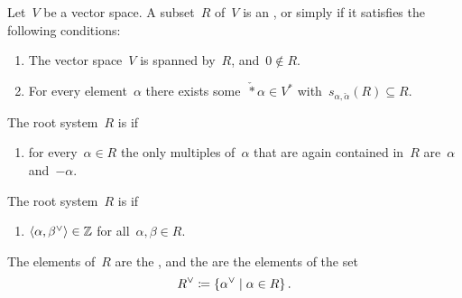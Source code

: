\begin{definition}
  Let~$V$ be a vector space.
  A subset~$R$ of~$V$ is an , or simply  if it satisfies the following conditions:
  \begin{enumerate}
    \item
      The vector space~$V$ is spanned by~$R$, and~$0 \notin R$.
    \item
      For every element~$\alpha$ there exists some~$\check*{\alpha} \in V^*$ with~$s_{\alpha, \check{\alpha}}(R) \subseteq R$.
  \end{enumerate}
  The root system~$R$ is  if
  \begin{enumerate}[resume]
    \item
      for every~$\alpha \in R$ the only multiples of~$\alpha$ that are again contained in~$R$ are~$\alpha$ and~$-\alpha$.
  \end{enumerate}
  The root system~$R$ is  if
  \begin{enumerate}[resume]
    \item
      $\pair{\alpha, \check{\beta}} \in \Integer$ for all~$\alpha, \beta \in R$.
  \end{enumerate}
  The elements of~$R$ are the , and the  are the elements of the set
  \[
    \check{R}
    \defined
    \{
      \check{\alpha}
    \suchthat
      \alpha \in R
    \} \,.
  \]
\end{definition}


